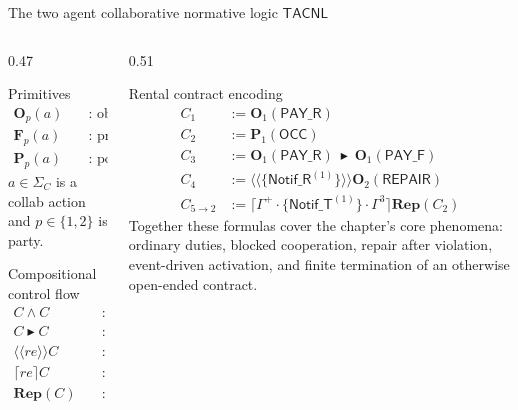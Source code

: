 \documentclass[9pt,aspectratio=169]{beamer}
\newcommand{\logic}[1]{\ensuremath{\mathsf{#1}}\xspace}
\newcommand{\cDL}{\logic{TACNL}}
\newcommand{\repair}{\ensuremath{\blacktriangleright}}
\newcommand{\obl}[2][]{\mathbf{O}_{#1}(#2)}
\newcommand{\frb}[2][]{\mathbf{F}_{#1}(#2)}
\newcommand{\perm}[2][]{\mathbf{P}_{#1}(#2)}
\newcommand{\repit}[1]{\mathbf{Rep}(#1)}
\newcommand{\guard}[2][]{\lceil #1 \rceil #2}
\newcommand{\trig}[2][]{\langle\!\langle #1 \rangle\!\rangle #2}
\newcommand{\PAY}{\ensuremath{\mathsf{PAY\_R}}\xspace}
\newcommand{\PAYF}{\ensuremath{\mathsf{PAY\_F}}\xspace}
\newcommand{\OCC}{\ensuremath{\mathsf{OCC}}\xspace}
\newcommand{\notifterm}{\ensuremath{\mathsf{Notif\_T}}}
\begin{document}
\begin{frame}{The two agent collaborative normative logic \cDL}
\small
\begin{columns}[T,totalwidth=\textwidth]
\begin{column}{0.47\textwidth}
  \begin{block}{Primitives}
    \footnotesize
    \[
    \begin{aligned}
    \obl[p]{a} &\quad \text{: obligation}\\
    \frb[p]{a} &\quad \text{: prohibition}\\
    \perm[p]{a} &\quad \text{: power}
    \end{aligned}
    \]
     $a \in \Sigma_C$ is a collab action and $p \in \{1,2\}$ is party.
  \end{block}

  \begin{block}{Compositional control flow}
    \footnotesize
    \[
    \begin{aligned}
    C \wedge C &\quad \text{: parallel duties}\\
    C \repair C &\quad \text{: contrary-to-duty repair}\\
    \trig[re]{C} &\quad \text{: event-triggered activation}\\
    \guard[re]{C} &\quad \text{: termination / bounded applicability}\\
    \repit{C} &\quad \text{: open-ended repetition}
    \end{aligned}
    \]
  \end{block}
\end{column}
\begin{column}{0.51\textwidth}
  \begin{block}{Rental contract encoding}
    \footnotesize
    \[
    \begin{aligned}
    C_1 &:= \obl[1]{\PAY}\\
    C_2 &:= \perm[1]{\OCC}\\
    C_3 &:= \obl[1]{\PAY}\ \repair\ \obl[1]{\PAYF}\\
    C_4 &:= \trig[\{\mathsf{Notif\_R}^{(1)}\}]{\obl[2]{\mathsf{REPAIR}}}\\
    C_{5\to2} &:= \guard[\Gamma^+\!\cdot\!\{\notifterm^{(1)}\}\!\cdot\!\Gamma^3]\repit{C_2}
    \end{aligned}
    \]
    \footnotesize
    Together these formulas cover the chapter's core phenomena: ordinary duties, blocked cooperation, repair after violation, event-driven activation, and finite termination of an otherwise open-ended contract.
  \end{block}
\end{column}
\end{columns}
\end{frame}
\end{document}
